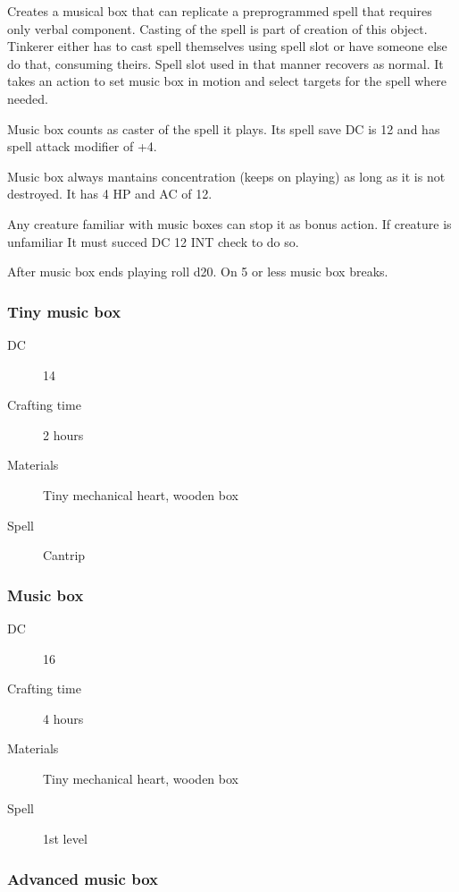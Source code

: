 Creates a musical box that can replicate a preprogrammed spell that requires only verbal component. Casting of the spell is part of
creation of this object. Tinkerer either has to cast spell themselves using spell slot or have someone else do that, consuming theirs. Spell slot used in that manner recovers as normal. It takes an action to set music box in motion and select targets for the spell where needed.

Music box counts as caster of the spell it plays. Its spell save DC is 12 and has spell attack modifier of +4.

Music box always mantains concentration (keeps on playing) as long as it is not destroyed. It has 4 HP and AC of 12.

Any creature familiar with music boxes can stop it as bonus action. If creature is unfamiliar It must succed DC 12 INT check to do so.

After music box ends playing roll d20. On 5 or less music box breaks.

\subsubsection{Tiny music box}

\begin{description}
\item [DC] 14
\item [Crafting time] 2 hours
\item [Materials] Tiny mechanical heart, wooden box
\item [Spell] Cantrip
\end{description}

\subsubsection{Music box}

\begin{description}
\item [DC] 16
\item [Crafting time] 4 hours
\item [Materials] Tiny mechanical heart, wooden box
\item [Spell] 1st level
\end{description}

\subsubsection{Advanced music box}

